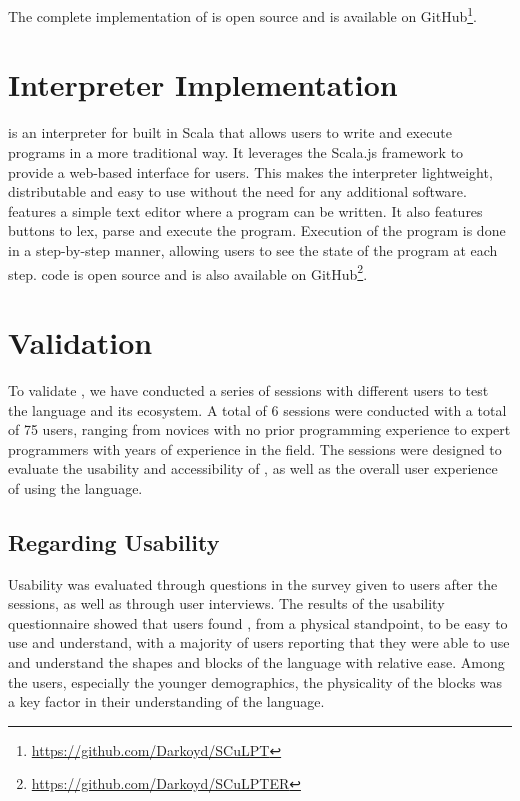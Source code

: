 The complete implementation of \sculpt is open source and is available on GitHub\footnote{\url{https://github.com/Darkoyd/SCuLPT}}.

\section{Interpreter Implementation}
\label{sec:results:interpreter}
\sculpter is an interpreter for \sculpt built in Scala that allows users to write and execute \sculpt programs in a more traditional way.
It leverages the Scala.js framework to provide a web-based interface for users.
This makes the interpreter lightweight, distributable and easy to use without the need for any additional software.
\sculpter features a simple text editor where a program can be written. It also features buttons to lex, parse and execute the program.
Execution of the program is done in a step-by-step manner, allowing users to see the state of the program at each step.
\sculpter code is open source and is also available on GitHub\footnote{\url{https://github.com/Darkoyd/SCuLPTER}}.


\section{Validation}
\label{sec:results:validation}
To validate \sculpt, we have conducted a series of sessions with different users to test the language and its ecosystem.
A total of 6 sessions were conducted with a total of 75 users, ranging from novices with no prior programming experience to expert programmers with years of experience in the field.
The sessions were designed to evaluate the usability and accessibility of \sculpt, as well as the overall user experience of using the language.

\subsection{Regarding Usability}
\label{sec:results:validation:usability}
Usability was evaluated through questions in the survey given to users after the sessions, as well as through user interviews.
The results of the usability questionnaire showed that users found \sculpt, from a physical standpoint, to be easy to use and understand, 
with a majority of users reporting that they were able to use and understand the shapes and blocks of the language with relative ease.
Among the users, especially the younger demographics, the physicality of the blocks was a key factor in their understanding of the language.

